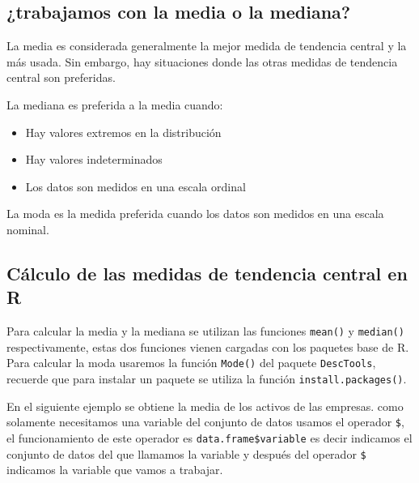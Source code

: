 \documentclass[]{book}
\newenvironment{Shaded}{\begin{snugshade}}{\end{snugshade}}
\newcommand{\KeywordTok}[1]{\textcolor[rgb]{0.13,0.29,0.53}{\textbf{#1}}}
\newcommand{\NormalTok}[1]{#1}
\newcommand{\OperatorTok}[1]{\textcolor[rgb]{0.81,0.36,0.00}{\textbf{#1}}}
\providecommand{\tightlist}{%
  \setlength{\itemsep}{0pt}\setlength{\parskip}{0pt}}
\begin{document}
\hypertarget{trabajamos-con-la-media-o-la-mediana}{%
\subsection{¿trabajamos con la media o la mediana?}\label{trabajamos-con-la-media-o-la-mediana}}

La media es considerada generalmente la mejor medida de tendencia central y la más usada. Sin embargo, hay situaciones donde las otras medidas de tendencia central son preferidas.

La mediana es preferida a la media cuando:

\begin{itemize}
\tightlist
\item
  Hay valores extremos en la distribución
\item
  Hay valores indeterminados
\item
  Los datos son medidos en una escala ordinal
\end{itemize}

La moda es la medida preferida cuando los datos son medidos en una escala nominal.

\hypertarget{calculo-de-las-medidas-de-tendencia-central-en-r}{%
\subsection{Cálculo de las medidas de tendencia central en R}\label{calculo-de-las-medidas-de-tendencia-central-en-r}}

Para calcular la media y la mediana se utilizan las funciones \texttt{mean()} y \texttt{median()} respectivamente, estas dos funciones vienen cargadas con los paquetes base de R. Para calcular la moda usaremos la función \texttt{Mode()} del paquete \texttt{DescTools}, recuerde que para instalar un paquete se utiliza la función \texttt{install.packages()}.

En el siguiente ejemplo se obtiene la media de los activos de las empresas. como solamente necesitamos una variable del conjunto de datos usamos el operador \texttt{\$}, el funcionamiento de este operador es \texttt{data.frame\$variable} es decir indicamos el conjunto de datos del que llamamos la variable y después del operador \texttt{\$} indicamos la variable que vamos a trabajar.

\begin{Shaded}
\end{Shaded}
\end{document}
